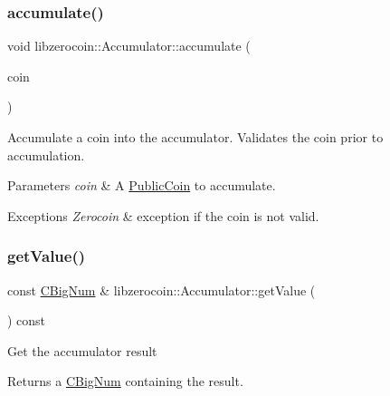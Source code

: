 \subsubsection{\texorpdfstring{accumulate()}{accumulate()}}
{\footnotesize\ttfamily void libzerocoin\+::\+Accumulator\+::accumulate (\begin{DoxyParamCaption}\item[{const \mbox{\hyperlink{classlibzerocoin_1_1_public_coin}{Public\+Coin}} \&}]{coin }\end{DoxyParamCaption})}

Accumulate a coin into the accumulator. Validates the coin prior to accumulation.


\begin{DoxyParams}{Parameters}
{\em coin} & A \mbox{\hyperlink{classlibzerocoin_1_1_public_coin}{Public\+Coin}} to accumulate.\\
\hline
\end{DoxyParams}

\begin{DoxyExceptions}{Exceptions}
{\em Zerocoin} & exception if the coin is not valid. \\
\hline
\end{DoxyExceptions}
\mbox{\label{classlibzerocoin_1_1_accumulator_abe9f6281164864e8cd7ca48ad8a7bd18}} 
\subsubsection{\texorpdfstring{getValue()}{getValue()}}
{\footnotesize\ttfamily const \mbox{\hyperlink{class_c_big_num}{C\+Big\+Num}} \& libzerocoin\+::\+Accumulator\+::get\+Value (\begin{DoxyParamCaption}{ }\end{DoxyParamCaption}) const}

Get the accumulator result

\begin{DoxyReturn}{Returns}
a \mbox{\hyperlink{class_c_big_num}{C\+Big\+Num}} containing the result. 
\end{DoxyReturn}
\mbox{\label{classlibzerocoin_1_1_accumulator_a03bec513778240e9ddfcd2103524fd33}} 
